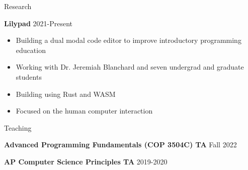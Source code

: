 \documentclass{resume}
\begin{document}
\begin{rSection}{Research}
\vspace{-1.25em}

\item \textbf{Lilypad} {2021-Present}
\begin{itemize}
    \itemsep -3pt {} 
    \vspace{-0.35em}
    \item Building a dual modal code editor to improve introductory programming education
    \item Working with Dr. Jeremiah Blanchard and seven undergrad and graduate students
    \item Building using Rust and WASM
    \item Focused on the human computer interaction 
\end{itemize}

\end{rSection} 

\begin{rSection}{Teaching}
\vspace{-1.25em}

\item \textbf{Advanced Programming Fundamentals (COP 3504C) TA} \hfill {Fall 2022}
\item \textbf{AP Computer Science Principles TA} \hfill {2019-2020}

\end{rSection} 
\end{document}
